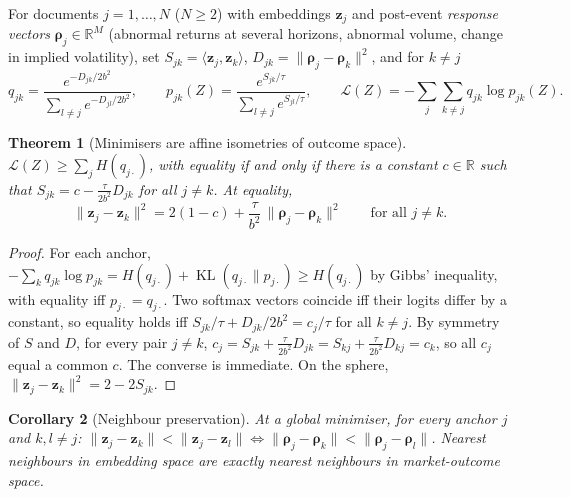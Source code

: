 \documentclass[11pt,a4paper]{article}
\theoremstyle{plain}
\newtheorem{theorem}{Theorem}[section]
\newtheorem{corollary}[theorem]{Corollary}
\theoremstyle{definition}
\theoremstyle{remark}
\newcommand{\R}{\mathbb{R}}
\newcommand{\z}{\bm{z}}
\DeclareMathOperator{\KL}{KL}
\begin{document}
For documents $j=1,\dots,N$ ($N\ge2$) with embeddings $\z_j$ and post-event \emph{response vectors} $\bm\rho_j\in\R^M$ (abnormal returns at several horizons, abnormal volume, change in implied volatility), set $S_{jk}=\langle\z_j,\z_k\rangle$, $D_{jk}=\|\bm\rho_j-\bm\rho_k\|^2$, and for $k\neq j$
\[
  q_{jk}=\frac{e^{-D_{jk}/2b^2}}{\sum_{l\neq j}e^{-D_{jl}/2b^2}},\qquad
  p_{jk}(Z)=\frac{e^{S_{jk}/\tau}}{\sum_{l\neq j}e^{S_{jl}/\tau}},\qquad
  \mathcal{L}(Z)=-\sum_j\sum_{k\neq j}q_{jk}\log p_{jk}(Z).
\]

\begin{theorem}[Minimisers are affine isometries of outcome space]\label{thm:racl}
$\mathcal{L}(Z)\ge\sum_jH(q_{j\cdot})$, with equality if and only if there is a constant $c\in\R$ such that $S_{jk}=c-\frac{\tau}{2b^2}D_{jk}$ for all $j\neq k$. At equality,
\[
  \|\z_j-\z_k\|^2=2(1-c)+\frac{\tau}{b^2}\,\|\bm\rho_j-\bm\rho_k\|^2\qquad\text{for all } j\neq k .
\]
\end{theorem}
\begin{proof}
For each anchor, $-\sum_kq_{jk}\log p_{jk}=H(q_{j\cdot})+\KL(q_{j\cdot}\|p_{j\cdot})\ge H(q_{j\cdot})$ by Gibbs' inequality, with equality iff $p_{j\cdot}=q_{j\cdot}$. Two softmax vectors coincide iff their logits differ by a constant, so equality holds iff $S_{jk}/\tau+D_{jk}/2b^2=c_j/\tau$ for all $k\neq j$. By symmetry of $S$ and $D$, for every pair $j\neq k$, $c_j=S_{jk}+\tfrac{\tau}{2b^2}D_{jk}=S_{kj}+\tfrac{\tau}{2b^2}D_{kj}=c_k$, so all $c_j$ equal a common $c$. The converse is immediate. On the sphere, $\|\z_j-\z_k\|^2=2-2S_{jk}$.
\end{proof}

\begin{corollary}[Neighbour preservation]\label{cor:order}
At a global minimiser, for every anchor $j$ and $k,l\neq j$: $\|\z_j-\z_k\|<\|\z_j-\z_l\|\iff\|\bm\rho_j-\bm\rho_k\|<\|\bm\rho_j-\bm\rho_l\|$. Nearest neighbours in embedding space are exactly nearest neighbours in market-outcome space.
\end{corollary}
\end{document}
